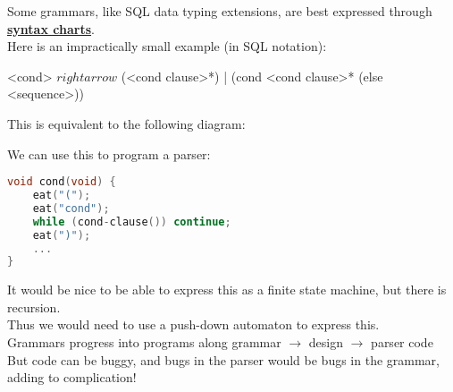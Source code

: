 \documentclass[../../lecture_notes.tex]{subfiles}
\begin{document}
\noindent Some grammars, like SQL data typing extensions, 
	are best expressed through \textbf{\underline{syntax charts}}.\\
Here is an impractically small example (in SQL notation):\begin{center}
	<cond> $rightarrow$ (<cond clause>*) | (cond <cond clause>* (else <sequence>)) \end{center}
This is equivalent to the following diagram: \begin{center}  \end{center}
We can use this to program a parser: \begin{lstlisting}[language=C]
void cond(void) {
	eat("(");
	eat("cond");
	while (cond-clause()) continue;
	eat(")");
	...
} \end{lstlisting}
It would be nice to be able to express this as a finite state machine, but there is recursion.\\
Thus we would need to use a push-down automaton to express this.\\
Grammars progress into programs along grammar $\rightarrow$ design $\rightarrow$ parser code\\
But code can be buggy, and bugs in the parser would be bugs in the grammar, adding to complication!
\end{document}
